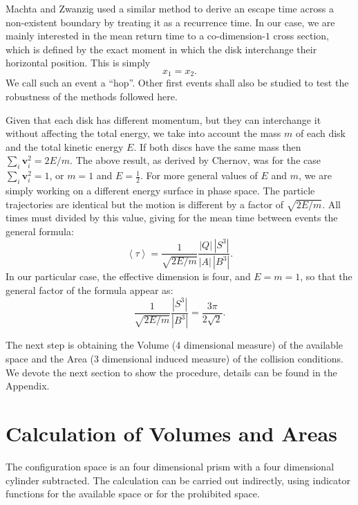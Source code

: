 \documentclass[letterpaper,10pt, jcp, aps]{revtex4-1}
\newcommand{\mean}[1]{\left \langle #1 \right \rangle}
\newcommand{\vv}{\mathbf{v}}
\begin{document}
Machta and Zwanzig \cite{MachtaZwan} used a similar method to derive an escape 
time across a non-existent boundary by treating it as a recurrence time.
In our case, we are mainly interested in the mean return time to 
a co-dimension-$1$ cross section, 
which is defined by the exact moment
in which the disk interchange their horizontal position. This is simply
\begin{equation} \label{condchoque}
x_1 = x_2.
\end{equation}
We call such an event a ``hop''. Other first events shall also be studied
to test the robustness of the methods followed here.

Given that each disk has different momentum, but
they can interchange it without affecting the
total energy, we take into account the mass $m$ of each disk 
and the total kinetic energy $E$.
If both discs have the same mass then $\sum_i \vv_i^2 = 2E / m$.
The above result, as derived by Chernov, 
was for the case $\sum_i \vv_i^2 = 1$, or $m=1$ and $E=\frac{1}{2}$.  
For more general values of $E$ and $m$, 
we are simply working on a different energy surface in phase space. 
The particle trajectories are identical but the motion is different
by a factor of
$\sqrt{2E/m}$. All times must divided by this value, 
giving for
the mean time between events the general formula:
\begin{equation} \label{meantimegeneral}
  \mean{\tau} =  \frac{1}{\sqrt{2E / m}} 
\frac{|Q| \, |S^3|} {|A| \, |B^3|}.	
\end{equation}
In our particular case, the effective dimension is four,
and $E=m=1$, so that the general factor of the formula appear as:
\begin{equation} \label{meantimegeneralredux}
   \frac{1}{\sqrt{2E / m}} 
\frac{|S^3|}{|B^3|}=\frac{3\pi}{2\sqrt{2}}.	 
\end{equation}

The next step is obtaining the Volume (4 dimensional measure) of
the available space and the Area (3 dimensional induced measure) of
the collision conditions. We devote the next section to
show the procedure, details can be found in the Appendix.


\section{Calculation of Volumes and Areas}

The configuration
space is an four dimensional prism with a four dimensional
cylinder subtracted.
The calculation can be carried out indirectly,
 using indicator functions for the
available space or for the prohibited space.
\end{document}
